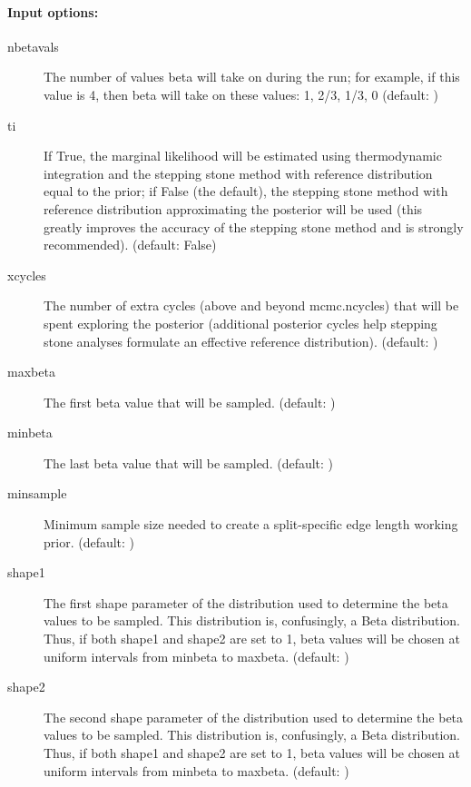 \paragraph[Input options]{Input options:}\begin{description}
\item[\bftt  nbetavals] The number of values beta will take on during the run; for example, if this value is 4, then beta will take on these values: 1, 2/3, 1/3, 0 (default: {})
\item[\bftt  ti] If True, the marginal likelihood will be estimated using thermodynamic integration and the stepping stone method with reference distribution equal to the prior; if False (the default), the stepping stone method with reference distribution approximating the posterior will be used (this greatly improves the accuracy of the stepping stone method and is strongly recommended). (default: {\bftt  False})
\item[\bftt  xcycles] The number of extra cycles (above and beyond mcmc.ncycles) that will be spent exploring the posterior (additional posterior cycles help stepping stone analyses formulate an effective reference distribution). (default: {})
\item[\bftt  maxbeta] The first beta value that will be sampled. (default: {})
\item[\bftt  minbeta] The last beta value that will be sampled. (default: {})
\item[\bftt  minsample] Minimum sample size needed to create a split-specific edge length working prior. (default: {})
\item[\bftt  shape1] The first shape parameter of the distribution used to determine the beta values to be sampled. This distribution is, confusingly, a Beta distribution. Thus, if both shape1 and shape2 are set to 1, beta values will be chosen at uniform intervals from minbeta to maxbeta. (default: {})
\item[\bftt  shape2] The second shape parameter of the distribution used to determine the beta values to be sampled. This distribution is, confusingly, a Beta distribution. Thus, if both shape1 and shape2 are set to 1, beta values will be chosen at uniform intervals from minbeta to maxbeta. (default: {})
\end{description}
